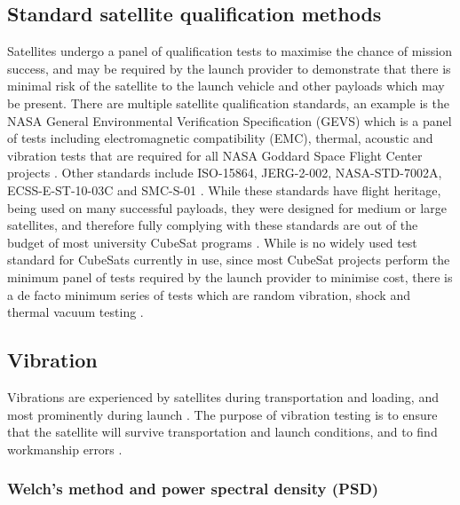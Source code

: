 \documentclass[a4paper,11pt]{article}
\begin{document}
\subsection{Standard satellite qualification methods}
Satellites undergo a panel of qualification tests to maximise the chance of mission success, and may be required by the launch provider to demonstrate that there is minimal risk of the satellite to the launch vehicle and other payloads which may be present. There are multiple satellite qualification standards, an example is the NASA General Environmental Verification Specification (GEVS) which is a panel of tests including electromagnetic compatibility (EMC), thermal, acoustic and vibration tests that are required for all NASA Goddard Space Flight Center projects \cite{nasa-gevs}. Other standards include ISO-15864, JERG-2-002, NASA-STD-7002A, ECSS-E-ST-10-03C and SMC-S-01 \cite{cho2012overview}. While these standards have flight heritage, being used on many successful payloads, they were designed for medium or large satellites, and therefore fully complying with these standards are out of the budget of most university CubeSat programs \cite{cho2012overview}. While is no widely used test standard for CubeSats currently in use, since most CubeSat projects perform the minimum panel of tests required by the launch provider to minimise cost, there is a de facto minimum series of tests which are random vibration, shock and thermal vacuum testing \cite{welle2020overview}.


\subsection{Vibration}
Vibrations are experienced by satellites during transportation and loading, and most prominently during launch \cite{brown_elements_2002}. The purpose of vibration testing is to ensure that the satellite will survive transportation and launch conditions, and to find workmanship errors \cite{brown_elements_2002,gordon2015benefits}.

\subsubsection{Welch's method and power spectral density (PSD)}

\end{document}
